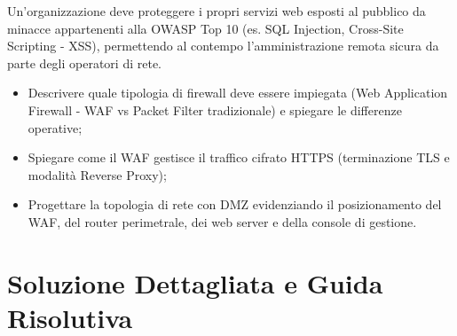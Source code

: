 \documentclass[11pt,a4paper]{article}
\begin{document}
\begin{questionbox}
Un'organizzazione deve proteggere i propri servizi web esposti al pubblico da minacce appartenenti alla OWASP Top 10 (es. SQL Injection, Cross-Site Scripting - XSS), permettendo al contempo l'amministrazione remota sicura da parte degli operatori di rete.
\begin{itemize}
    \item Descrivere quale tipologia di firewall deve essere impiegata (Web Application Firewall - WAF vs Packet Filter tradizionale) e spiegare le differenze operative;
    \item Spiegare come il WAF gestisce il traffico cifrato HTTPS (terminazione TLS e modalit\`a Reverse Proxy);
    \item Progettare la topologia di rete con DMZ evidenziando il posizionamento del WAF, del router perimetrale, dei web server e della console di gestione.
\end{itemize}
\end{questionbox}

\newpage
\section{Soluzione Dettagliata e Guida Risolutiva}
\end{document}
